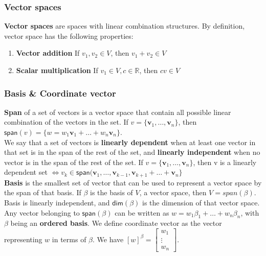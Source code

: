 \documentclass[12pt]{article}
\begin{document}
\subsubsection*{Vector spaces}
\textbf{Vector spaces} are spaces with linear combination structures. By definition, vector space has the following properties:
\begin{enumerate}
\item \textbf{Vector addition} If $v_1, v_2 \in V$, then $v_1+v_2\in V$
\item \textbf{Scalar multiplication} If $v_1 \in V, c \in \mathbb{R}$, then $cv \in V$
\end{enumerate}


\subsubsection*{Basis \& Coordinate vector}
\textbf{Span} of a set of vectors is a vector space that contain all possible linear combination of the vectors in the set. If $v = \{\textbf{v}_1,\ldots,\textbf{v}_n\}$, then $\textsf{span}(v) = \{w = w_1\textbf{v}_1+\ldots+w_n\textbf{v}_n\}$.\\
We say that a set of vectors is \textbf{linearly dependent} when at least one vector in that set is in the span of the rest of the set, and \textbf{linearly independent} when no vector is in the span of the rest of the set. If $v = \{\textbf{v}_1,\ldots,\textbf{v}_n\}$, then v is a linearly dependent set $\Leftrightarrow v_k \in \textsf{span}(\textbf{v}_1,\ldots,\textbf{v}_{k-1},\textbf{v}_{k+1}+\ldots+\textbf{v}_n\}$\\
\textbf{Basis} is the smallest set of vector that can be used to represent a vector space by the span of that basis. If $\beta$ is the basis of $V$, a vector space, then $V = span(\beta)$. Basis is linearly independent, and $\textsf{dim}(\beta)$ is the dimension of that vector space.\\
Any vector belonging to $\textsf{span}(\beta)$ can be written as $w = w_1\beta_1 + \ldots+ w_n\beta_n$, with $\beta$ being an \textbf{ordered basis}. We define coordinate vector as the vector representing $w$ in terms of $\beta$. We have $[w]^\beta= \begin{bmatrix}
w_1\\
\vdots\\
w_n
\end{bmatrix}$.

\end{document}
